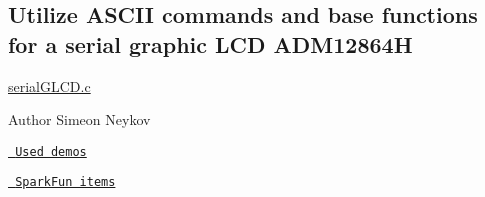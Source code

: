 \subsection*{Utilize A\+S\+C\+II commands and base functions for a serial graphic L\+CD A\+D\+M12864H}

\mbox{\hyperlink{serial_g_l_c_d_8c}{serial\+G\+L\+C\+D.\+c}}

\begin{DoxyAuthor}{Author}
Simeon Neykov
\end{DoxyAuthor}
\href{https://www.avrfreaks.net/forum/tut-c-bit-manipulation-aka-programming-101?name=PNphpBB2&file=viewtopic&t=37871}{\texttt{ Used demos}}

\href{https://learn.sparkfun.com/tutorials/serial-graphic-lcd-hookup/?_ga=1.12355956.1126191215.1366741676}{\texttt{ Spark\+Fun items}} 